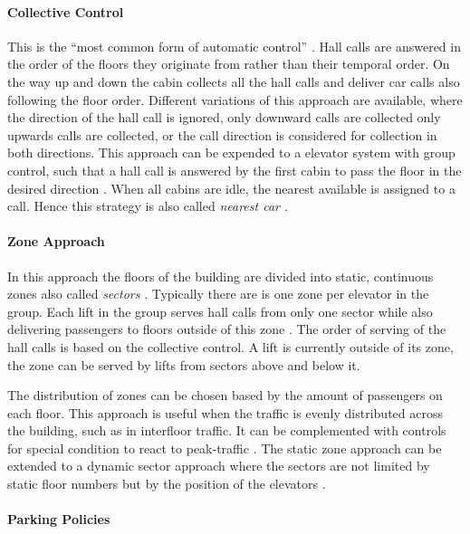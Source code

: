 \paragraph{Collective Control}
This is the \enquote{most common form of automatic control} \autocite[][p.~237]{barney2016handbook}.
Hall calls are answered in the order of the floors they originate from rather than their temporal order.
On the way up and down the cabin collects all the hall calls and deliver car calls also following the floor order.
Different variations of this approach are available, where the direction of the hall call is ignored, only downward calls are collected only upwards calls are collected, or the call direction is considered for collection in both directions.
This approach can be expended to a elevator system with group control, such that a hall call is answered by the first cabin to pass the floor in the desired direction \autocite[][p.~238]{barney2016handbook}.
When all cabins are idle, the nearest available is assigned to a call. Hence this strategy is also called \emph{nearest car}
\autocite[][p.~244]{barney2016handbook}.

\paragraph{Zone Approach}
In this approach the floors of the building are divided into static, continuous zones also called \emph{sectors} \autocite[][p.~247]{barney2016handbook}. 
Typically there are is one zone per elevator in the group. 
Each lift in the group serves hall calls from only one sector
while also delivering passengers to floors outside of this zone
\autocite[][pp.~3--6]{axelsson2013strategies}.
The order of serving of the hall calls is based on the collective control.
A lift is currently outside of its zone, 
the zone can be served by lifts from sectors above and below it.

The distribution of zones can be chosen based by the amount of passengers on each floor.
This approach is useful when the traffic is evenly distributed across the building, such as in interfloor traffic. It can be complemented with controls for special condition to react to peak-traffic \autocite[][p.~247]{barney2016handbook}.
The static zone approach can be extended to a dynamic sector approach where the sectors are not limited by static floor numbers but by the position of the elevators \autocite[][p.~250]{barney2016handbook}.


\paragraph{Parking Policies}

